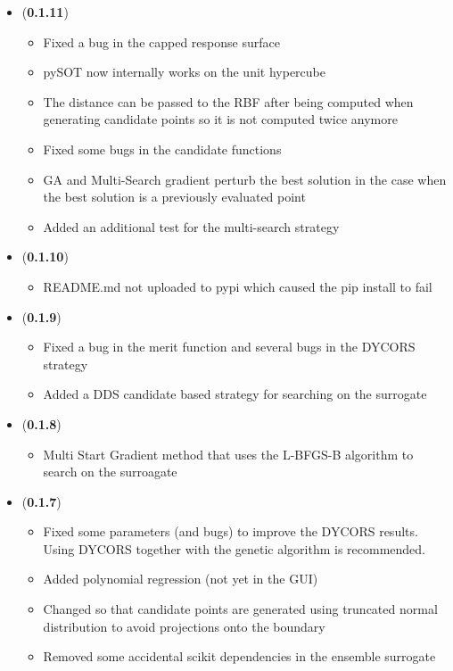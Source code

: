 \documentclass[]{article}
\begin{document}
\begin{itemize}
\item (\textbf{0.1.11}) 
\begin{itemize}
\item Fixed a bug in the capped response surface
\item pySOT now internally works on the unit hypercube
\item The distance can be passed to the RBF after being computed when generating candidate points so it is not computed twice anymore
\item Fixed some bugs in the candidate functions
\item GA and Multi-Search gradient perturb the best solution in the case when the best solution is a previously evaluated point
\item Added an additional test for the multi-search strategy
\end{itemize}

\item (\textbf{0.1.10}) 
\begin{itemize}
\item README.md not uploaded to pypi which caused the pip install to fail
\end{itemize}

\item (\textbf{0.1.9}) 
\begin{itemize}
\item Fixed a bug in the merit function and several bugs in the DYCORS strategy
\item Added a DDS candidate based strategy for searching on the surrogate
\end{itemize}

\item (\textbf{0.1.8}) 
\begin{itemize}
\item Multi Start Gradient method that uses the L-BFGS-B algorithm to search on the surroagate
\end{itemize}

\item (\textbf{0.1.7}) 
\begin{itemize}
\item Fixed some parameters (and bugs) to improve the DYCORS results. Using DYCORS together with the genetic algorithm is recommended.
\item Added polynomial regression (not yet in the GUI)
\item Changed so that candidate points are generated using truncated normal distribution to avoid projections onto the boundary
\item Removed some accidental scikit dependencies in the ensemble surrogate
\end{itemize}


\end{itemize}
\end{document}
